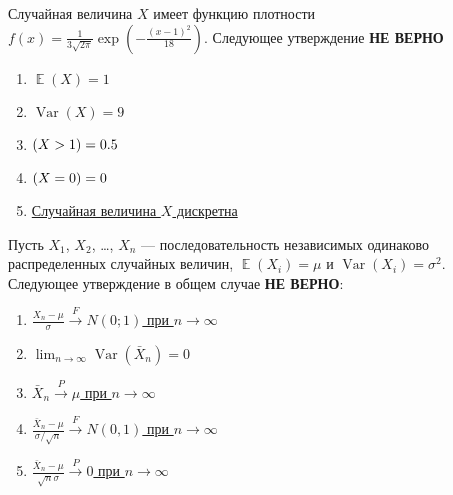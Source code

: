 \documentclass[t]{beamer}
\DeclareMathOperator{\Var}{Var}
\DeclareMathOperator{\E}{\mathbb{E}}
\let\P\relax
\DeclareMathOperator{\P}{\mathbb{P}}
\begin{document}
 \begin{frame} \label{29} 
\begin{block}{29} 

Случайная величина $X$ имеет функцию плотности $f(x)=\frac{1}{3\sqrt{2\pi}} \exp\left(-\frac{(x-1)^2}{18} \right)$. Следующее утверждение \textbf{НЕ ВЕРНО}
 


 \end{block} 
\begin{enumerate} 
\item[] \hyperlink{29-No}{\beamergotobutton{} $\E(X)=1$}
\item[] \hyperlink{29-No}{\beamergotobutton{} $\Var(X)=9$}
\item[] \hyperlink{29-No}{\beamergotobutton{} $\P(X>1)=0.5$}
\item[] \hyperlink{29-No}{\beamergotobutton{} $\P(X=0)=0$}
\item[] \hyperlink{29-Yes}{\beamergotobutton{} Случайная величина $X$ дискретна}
\end{enumerate} 
\end{frame} 


 \begin{frame} \label{30} 
\begin{block}{30} 

Пусть $X_1$, $X_2$, \ldots, $X_n$ — последовательность независимых одинаково распределенных случайных величин, $\E(X_i)=\mu$ и $\Var(X_i)=\sigma^2$. Следующее утверждение в общем случае \textbf{НЕ ВЕРНО}:
 


 \end{block} 
\begin{enumerate} 
\item[] \hyperlink{30-Yes}{\beamergotobutton{} $\frac{X_n-\mu}{\sigma} \overset{F}{\to} N(0;1)$ при $n\to\infty$}
\item[] \hyperlink{30-No}{\beamergotobutton{} $\lim_{n\to\infty} \Var(\bar{X}_n)=0$}
\item[] \hyperlink{30-No}{\beamergotobutton{} $\bar{X}_n \overset{P}{\to} \mu$ при $n\to\infty$}
\item[] \hyperlink{30-No}{\beamergotobutton{}$\frac{\bar{X}_n-\mu}{\sigma /\sqrt{n}} \overset{F}{\to } N(0,1) $ при $n\to\infty$}
\item[] \hyperlink{30-No}{\beamergotobutton{} $\frac{\bar{X}_n-\mu}{\sqrt{n} \sigma } \overset{P}{\to } 0 $ при $n\to\infty$}
\end{enumerate} 
\end{frame} 
\end{document}
